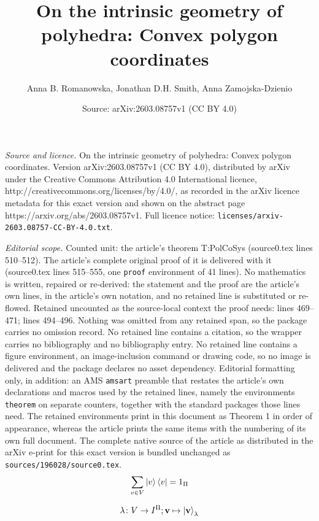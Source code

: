 \documentclass[10pt,a4paper]{amsart}
\title{On the intrinsic geometry of polyhedra: Convex polygon coordinates}
\author{Anna B. Romanowska, Jonathan D.H. Smith, Anna Zamojska-Dzienio}
\date{Source: arXiv:2603.08757v1 (CC BY 4.0)}
\begin{document}
\maketitle

\noindent\emph{Source and licence.} On the intrinsic geometry of polyhedra: Convex polygon coordinates. Version arXiv:2603.08757v1 (CC BY 4.0), distributed by arXiv under the Creative Commons Attribution 4.0 International licence, http://creativecommons.org/licenses/by/4.0/, as recorded in the arXiv licence metadata for this exact version and shown on the abstract page https://arxiv.org/abs/2603.08757v1. Full licence notice: \texttt{licenses/arxiv-2603.08757-CC-BY-4.0.txt}.\par\smallskip

\noindent\textit{Editorial scope.} Counted unit: the article's theorem T:PolCoSys (source0.tex lines 510--512). The article's complete original proof of it is delivered with it (source0.tex lines 515--555, one \texttt{proof} environment of 41 lines). No mathematics is written, repaired or re-derived: the statement and the proof are the article's own lines, in the article's own notation, and no retained line is substituted or re-flowed.  Retained uncounted as the source-local context the proof needs: lines 469--471; lines 494--496.  Nothing was omitted from any retained span, so the package carries no omission record.  No retained line contains a citation, so the wrapper carries no bibliography and no bibliography entry.  No retained line contains a figure environment, an image-inclusion command or drawing code, so no image is delivered and the package declares no asset dependency.  Editorial formatting only, in addition: an AMS \texttt{amsart} preamble that restates the article's own declarations and macros used by the retained lines, namely the environments \texttt{theorem} on separate counters, together with the standard packages those lines need.  The retained environments print in this document as Theorem 1 in order of appearance, whereas the article prints the same items with the numbering of its own full document.  The complete native source of the article as distributed in the arXiv e-print for this exact version is bundled unchanged as \texttt{sources/196028/source0.tex}.
\begin{equation}\label{E:BraktPid}
\sum_{v\in V}\ket v\bra v=1_\Pi
\end{equation}

\begin{equation}\label{E:CoSyKapa}
\lambda\colon V\to I^\Pi;\mathbf v\mapsto\ket{\mathbf v}_\lambda
\end{equation}
\end{document}
